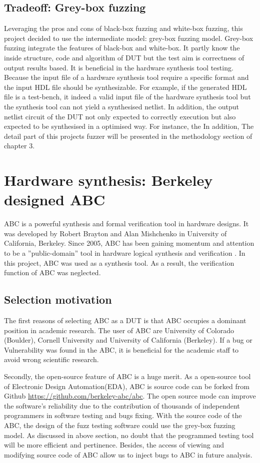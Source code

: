 \subsection{Tradeoff: Grey-box fuzzing}
Leveraging the pros and cons of black-box fuzzing and white-box fuzzing, this project decided to use the intermediate model: grey-box fuzzing model. Grey-box fuzzing integrate the features of black-box and white-box. It partly know the inside structure, code and algorithm of DUT but the test aim is correctness of output results based. It is beneficial in the hardware synthesis tool testing. Because the input file of a hardware synthesis tool require a specific format and the input HDL file should be synthesizable. For example, if the generated HDL file is a test-bench, it indeed a valid input file of the hardware synthesis tool but the synthesis tool can not yield a synthesised netlist. In addition, the output netlist circuit of the DUT not only expected to correctly execution but also expected to be synthesised in a optimised way. For instance, the \cite{havrikov2017efficient} %
In addition,  
The detail part of this projects fuzzer will be presented in the methodology section of chapter 3.

\section{Hardware synthesis: Berkeley designed ABC}
ABC is a powerful synthesis and formal verification tool in hardware designs. It was developed by Robert Brayton and Alan Mishchenko in University of California, Berkeley. Since 2005, ABC has been gaining momentum and attention to be a ''public-domain'' tool in hardware logical synthesis and verification \cite{ABC}. In this project, ABC was used as a synthesis tool. As a result, the verification function of ABC was neglected. 
\subsection{Selection motivation}
The first reasons of selecting ABC as a DUT is that ABC occupies a dominant position in academic research. The user of ABC are University of Colorado (Boulder), Cornell University and University of California (Berkeley). If a bug or Vulnerability was found in the ABC, it is beneficial for the academic staff to avoid wrong scientific research. 

Secondly, the open-source feature of ABC is a huge merit. As a open-source tool of Electronic Design Automation(EDA), ABC is source code can be forked from Github \url{https://github.com/berkeley-abc/abc}. The open source mode can improve the software's reliability due to the contribution of thousands of independent programmers in software testing and bugs fixing.\cite{laurent2004understanding} With the source code of the ABC, the design of the fuzz testing software could use the grey-box fuzzing model. As discussed in above section, no doubt that the programmed testing tool will be more efficient and pertinence. Besides, the access of viewing and modifying source code of ABC allow us to inject bugs to ABC in future analysis.

